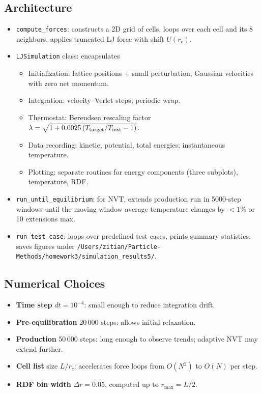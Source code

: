 \documentclass[11pt]{article}
\begin{document}
\subsection{Architecture}
\begin{itemize}
  \item \texttt{compute\_forces}: constructs a 2D grid of cells, loops over each cell and its 8 neighbors, applies truncated LJ force with shift $U(r_c)$.
  \item \texttt{LJSimulation} class: encapsulates
    \begin{itemize}
      \item Initialization: lattice positions + small perturbation, Gaussian velocities with zero net momentum.
      \item Integration: velocity–Verlet steps; periodic wrap.
      \item Thermostat: Berendsen rescaling factor 
      \(\lambda=\sqrt{1+0.0025\,(T_{\rm target}/T_{\rm inst}-1)}\).  
      \item Data recording: kinetic, potential, total energies; instantaneous temperature.
      \item Plotting: separate routines for energy components (three subplots), temperature, RDF.
    \end{itemize}
  \item \texttt{run\_until\_equilibrium}: for NVT, extends production run in 5000‐step windows until the moving‐window average temperature changes by $<1\%$ or 10 extensions max.
  \item \texttt{run\_test\_case}: loops over predefined test cases, prints summary statistics, saves figures under 
  \verb|/Users/zitian/Particle-Methods/homework3/simulation_results5/|.
\end{itemize}

\subsection{Numerical Choices}
\begin{itemize}
  \item \textbf{Time step} $dt=10^{-4}$: small enough to reduce integration drift.
  \item \textbf{Pre‐equilibration} 20\,000 steps: allows initial relaxation.
  \item \textbf{Production} 50\,000 steps: long enough to observe trends; adaptive NVT may extend further.
  \item \textbf{Cell list} size $L/r_c$: accelerates force loops from $O(N^2)$ to $O(N)$ per step.
  \item \textbf{RDF bin width} $\Delta r=0.05$, computed up to $r_{\max}=L/2$.
\end{itemize}
\end{document}

